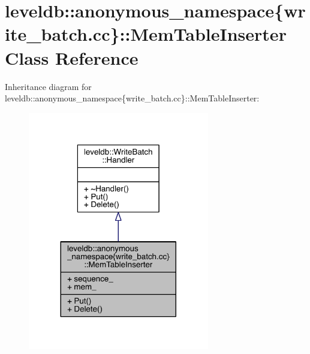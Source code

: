 \hypertarget{classleveldb_1_1anonymous__namespace_02write__batch_8cc_03_1_1_mem_table_inserter}{}\section{leveldb\+:\+:anonymous\+\_\+namespace\{write\+\_\+batch.\+cc\}\+:\+:Mem\+Table\+Inserter Class Reference}
\label{classleveldb_1_1anonymous__namespace_02write__batch_8cc_03_1_1_mem_table_inserter}


Inheritance diagram for leveldb\+:\+:anonymous\+\_\+namespace\{write\+\_\+batch.\+cc\}\+:\+:Mem\+Table\+Inserter\+:
\nopagebreak
\begin{figure}[H]
\begin{center}
\leavevmode
\includegraphics[width=224pt]{classleveldb_1_1anonymous__namespace_02write__batch_8cc_03_1_1_mem_table_inserter__inherit__graph}
\end{center}
\end{figure}



